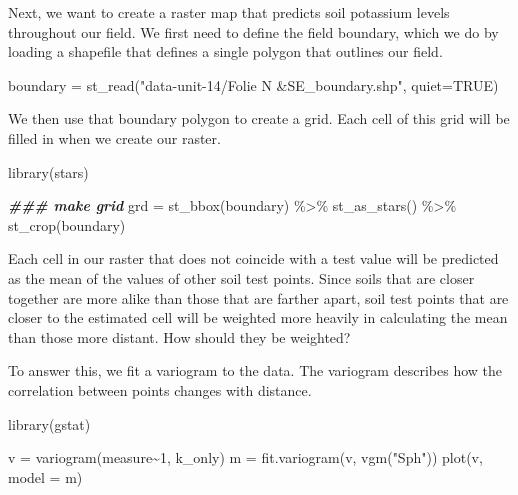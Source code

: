 \documentclass[
]{book}
\newenvironment{Shaded}{\begin{snugshade}}{\end{snugshade}}
\newcommand{\AttributeTok}[1]{\textcolor[rgb]{0.77,0.63,0.00}{#1}}
\newcommand{\ConstantTok}[1]{\textcolor[rgb]{0.00,0.00,0.00}{#1}}
\newcommand{\DecValTok}[1]{\textcolor[rgb]{0.00,0.00,0.81}{#1}}
\newcommand{\DocumentationTok}[1]{\textcolor[rgb]{0.56,0.35,0.01}{\textbf{\textit{#1}}}}
\newcommand{\FunctionTok}[1]{\textcolor[rgb]{0.00,0.00,0.00}{#1}}
\newcommand{\NormalTok}[1]{#1}
\newcommand{\OtherTok}[1]{\textcolor[rgb]{0.56,0.35,0.01}{#1}}
\newcommand{\SpecialCharTok}[1]{\textcolor[rgb]{0.00,0.00,0.00}{#1}}
\newcommand{\StringTok}[1]{\textcolor[rgb]{0.31,0.60,0.02}{#1}}
\begin{document}
Next, we want to create a raster map that predicts soil potassium levels throughout our field. We first need to define the field boundary, which we do by loading a shapefile that defines a single polygon that outlines our field.

\begin{Shaded}
\begin{Highlighting}[]
\NormalTok{boundary }\OtherTok{=} \FunctionTok{st\_read}\NormalTok{(}\StringTok{"data{-}unit{-}14/Folie N \&SE\_boundary.shp"}\NormalTok{, }\AttributeTok{quiet=}\ConstantTok{TRUE}\NormalTok{)}
\end{Highlighting}
\end{Shaded}

We then use that boundary polygon to create a grid. Each cell of this grid will be filled in when we create our raster.

\begin{Shaded}
\begin{Highlighting}[]
\FunctionTok{library}\NormalTok{(stars)}

\DocumentationTok{\#\#\# make grid}
\NormalTok{grd }\OtherTok{=} \FunctionTok{st\_bbox}\NormalTok{(boundary) }\SpecialCharTok{\%\textgreater{}\%}
  \FunctionTok{st\_as\_stars}\NormalTok{() }\SpecialCharTok{\%\textgreater{}\%}
  \FunctionTok{st\_crop}\NormalTok{(boundary) }
\end{Highlighting}
\end{Shaded}

Each cell in our raster that does not coincide with a test value will be predicted as the mean of the values of other soil test points. Since soils that are closer together are more alike than those that are farther apart, soil test points that are closer to the estimated cell will be weighted more heavily in calculating the mean than those more distant. How should they be weighted?

To answer this, we fit a variogram to the data. The variogram describes how the correlation between points changes with distance.

\begin{Shaded}
\begin{Highlighting}[]
\FunctionTok{library}\NormalTok{(gstat)}

\NormalTok{v }\OtherTok{=} \FunctionTok{variogram}\NormalTok{(measure}\SpecialCharTok{\textasciitilde{}}\DecValTok{1}\NormalTok{, k\_only)}
\NormalTok{m }\OtherTok{=} \FunctionTok{fit.variogram}\NormalTok{(v, }\FunctionTok{vgm}\NormalTok{(}\StringTok{"Sph"}\NormalTok{))}
\FunctionTok{plot}\NormalTok{(v, }\AttributeTok{model =}\NormalTok{ m)}
\end{Highlighting}
\end{Shaded}
\end{document}
